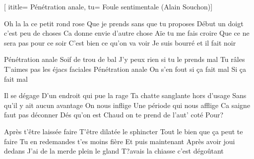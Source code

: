  [
ititle= {Pénétration anale},
tu= {Foule sentimentale (Alain Souchon)}]


\beginverse
Oh la la ce petit rond rose
Que je prends sans que tu proposes
Début un doigt c'est peu de choses
Ca donne envie d'autre chose
Aïe tu me fais croire
Que ce ne sera pas pour ce soir
C'est bien ce qu'on va voir
Je suis bourré et il fait noir
\endverse

\beginchorus
Pénétration anale
Soif de trou de bal
J'y peux rien si tu le prends mal
Tu râles
T'aimes pas les éjacs faciales
Pénétration anale
On s'en fout si ça fait mal
Si ça fait mal
\endchorus

\beginverse
Il se dégage
D'un endroit qui pue la rage
Ta chatte sanglante hors d'usage
Sans qu'il y ait aucun avantage
On nous inflige
Une période qui nous afflige
Ca saigne faut pas déconner
Dés qu'on est
Chaud on te prend de l'aut' coté
Pour?
\endverse

\beginverse
Après t'être laissée faire
T'être dilatée le sphincter
Tout le bien que ça peut te faire
Tu en redemandes t'es moins fière
Et puis maintenant
Après avoir joui dedans
J'ai de la merde plein le gland
T?avais la chiasse c'est dégoûtant 
\endverse

\endsong